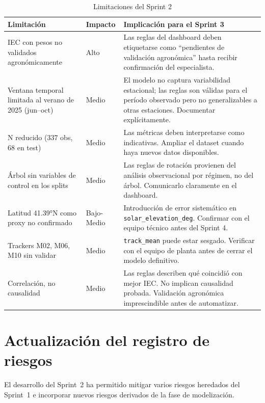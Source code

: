 \documentclass[12pt,a4paper]{article}
\begin{document}
\begin{table}[H]
\centering
\caption{Limitaciones del Sprint 2}
\label{tab:limitaciones}
\renewcommand{\arraystretch}{1.4}
\begin{tabularx}{\textwidth}{p{4.5cm} p{1.5cm} X}
\toprule
\textbf{Limitación} & \textbf{Impacto} & \textbf{Implicación para el Sprint 3} \\
\midrule
IEC con pesos no validados agronómicamente
  & Alto
  & Las reglas del dashboard deben etiquetarse como ``pendientes de validación agronómica'' hasta recibir confirmación del especialista. \\
Ventana temporal limitada al verano de 2025 (jun--oct)
  & Medio
  & El modelo no captura variabilidad estacional; las reglas son válidas para el período observado pero no generalizables a otras estaciones. Documentar explícitamente. \\
N reducido (337 obs, 68 en test)
  & Medio
  & Las métricas deben interpretarse como indicativas. Ampliar el dataset cuando haya nuevos datos disponibles. \\
Árbol sin variables de control en los splits
  & Medio
  & Las reglas de rotación provienen del análisis observacional por régimen, no del árbol. Comunicarlo claramente en el dashboard. \\
Latitud 41.39°N como proxy no confirmado
  & Bajo-Medio
  & Introducción de error sistemático en \texttt{solar\_elevation\_deg}. Confirmar con el equipo técnico antes del Sprint 4. \\
Trackers M02, M06, M10 sin validar
  & Medio
  & \texttt{track\_mean} puede estar sesgado. Verificar con el equipo de planta antes de cerrar el modelo definitivo. \\
Correlación, no causalidad
  & Medio
  & Las reglas describen qué coincidió con mejor IEC. No implican causalidad probada. Validación agronómica imprescindible antes de automatizar. \\
\bottomrule
\end{tabularx}
\end{table}

\newpage
\section{Actualización del registro de riesgos}

El desarrollo del Sprint~2 ha permitido mitigar varios riesgos heredados del Sprint~1 e incorporar nuevos riesgos derivados de la fase de modelización.
\end{document}
